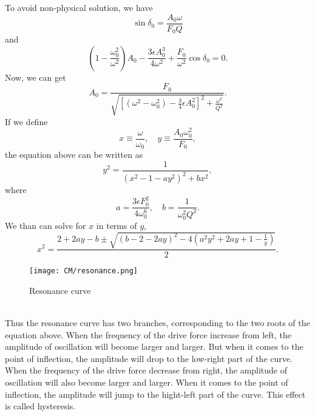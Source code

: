 To avoid non-physical solution, we have
\[\sin\delta_0 = \frac{A_0 \omega}{F_0 Q} \]
and
\[\left ( 1 - \frac{\omega_0^2}{\omega^2}\right ) A_0 - \frac{3\epsilon A_0^3}{4\omega^2} + \frac{F_0}{\omega^2}\cos\delta_0 = 0.\]
Now, we can get
\[A_0 = \frac{F_0}{\sqrt{\left[ (\omega^2 -\omega_0^2) - \frac{3}{4}\epsilon A_0^2 \right ]^2 + \frac{\omega^2}{Q^2} }}.\]
If we define
\[x \equiv \frac{\omega}{\omega_0} ,\quad y \equiv \frac{A_0 \omega_0^2}{F_0},\]
the equation above can be written as
\[y^2 = \frac{1}{(x^2-1-ay^2)^2 + bx^2}, \]
where
\[a = \frac{3\epsilon F_0^2}{4\omega_0^6}, \quad b = \frac{1}{\omega_0^2 Q^2}.\]
We than can solve for $x$ in terms of $y$,
\[x^2 = \frac{2 + 2ay-b \pm \sqrt{(b-2-2ay)^2-4(a^2y^2+2ay+1-\frac{1}{y})}}{2}.\]
\begin{figure}[!h]
	\centering
	\texttt{[image: CM/resonance.png]}
	\caption{Resonance curve}
\end{figure}
\\ 
Thus the resonance curve has two branches, corresponding to the two roots of the equation above. When the frequency of the drive force increase from left, the amplitude of oscillation will become larger and larger. But when it comes to the point of inflection, the amplitude will drop to the low-right part of the curve. When the frequency of the drive force decrease from right, the amplitude of oscillation will also become larger and larger. When it comes to the point of inflection, the amplitude will jump to the hight-left part of the curve. 
This effect is called hysteresis.

